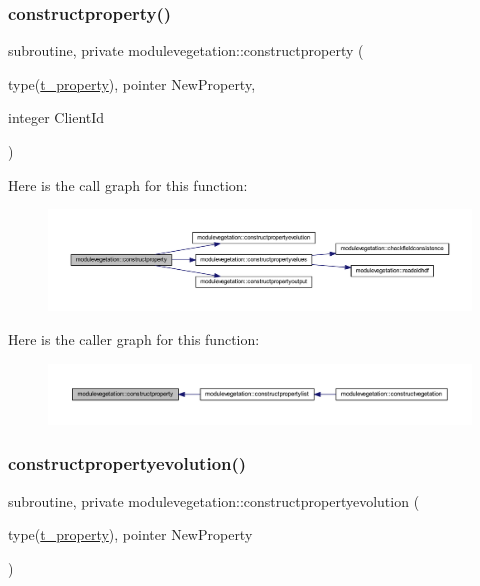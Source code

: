 \subsubsection{\texorpdfstring{constructproperty()}{constructproperty()}}
{\footnotesize\ttfamily subroutine, private modulevegetation\+::constructproperty (\begin{DoxyParamCaption}\item[{type(\mbox{\hyperlink{structmodulevegetation_1_1t__property}{t\+\_\+property}}), pointer}]{New\+Property,  }\item[{integer}]{Client\+Id }\end{DoxyParamCaption})\hspace{0.3cm}{\ttfamily [private]}}

Here is the call graph for this function\+:\nopagebreak
\begin{figure}[H]
\begin{center}
\leavevmode
\includegraphics[width=350pt]{namespacemodulevegetation_ac179d0f21b5052db939c21c142a5dda5_cgraph}
\end{center}
\end{figure}
Here is the caller graph for this function\+:\nopagebreak
\begin{figure}[H]
\begin{center}
\leavevmode
\includegraphics[width=350pt]{namespacemodulevegetation_ac179d0f21b5052db939c21c142a5dda5_icgraph}
\end{center}
\end{figure}
\mbox{\label{namespacemodulevegetation_ac6177be389c51bc5c4360fab4db5d775}} 
\subsubsection{\texorpdfstring{constructpropertyevolution()}{constructpropertyevolution()}}
{\footnotesize\ttfamily subroutine, private modulevegetation\+::constructpropertyevolution (\begin{DoxyParamCaption}\item[{type(\mbox{\hyperlink{structmodulevegetation_1_1t__property}{t\+\_\+property}}), pointer}]{New\+Property }\end{DoxyParamCaption})\hspace{0.3cm}{\ttfamily [private]}}

